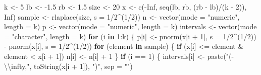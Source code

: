 \documentclass[
]{article}
\newenvironment{Shaded}{\begin{snugshade}}{\end{snugshade}}
\newcommand{\AttributeTok}[1]{\textcolor[rgb]{0.77,0.63,0.00}{#1}}
\newcommand{\ConstantTok}[1]{\textcolor[rgb]{0.00,0.00,0.00}{#1}}
\newcommand{\ControlFlowTok}[1]{\textcolor[rgb]{0.13,0.29,0.53}{\textbf{#1}}}
\newcommand{\DecValTok}[1]{\textcolor[rgb]{0.00,0.00,0.81}{#1}}
\newcommand{\FloatTok}[1]{\textcolor[rgb]{0.00,0.00,0.81}{#1}}
\newcommand{\FunctionTok}[1]{\textcolor[rgb]{0.00,0.00,0.00}{#1}}
\newcommand{\NormalTok}[1]{#1}
\newcommand{\OtherTok}[1]{\textcolor[rgb]{0.56,0.35,0.01}{#1}}
\newcommand{\SpecialCharTok}[1]{\textcolor[rgb]{0.00,0.00,0.00}{#1}}
\newcommand{\StringTok}[1]{\textcolor[rgb]{0.31,0.60,0.02}{#1}}
\begin{document}
\begin{Shaded}
\begin{Highlighting}[]
\NormalTok{k }\OtherTok{\textless{}{-}} \DecValTok{5}
\NormalTok{lb }\OtherTok{\textless{}{-}} \SpecialCharTok{{-}}\FloatTok{1.5}
\NormalTok{rb }\OtherTok{\textless{}{-}} \FloatTok{1.5}
\NormalTok{size }\OtherTok{\textless{}{-}} \DecValTok{20}
\NormalTok{x }\OtherTok{\textless{}{-}} \FunctionTok{c}\NormalTok{(}\SpecialCharTok{{-}}\ConstantTok{Inf}\NormalTok{, }\FunctionTok{seq}\NormalTok{(lb, rb, (rb }\SpecialCharTok{{-}}\NormalTok{ lb)}\SpecialCharTok{/}\NormalTok{(k }\SpecialCharTok{{-}} \DecValTok{2}\NormalTok{)), }\ConstantTok{Inf}\NormalTok{)}
\NormalTok{sample }\OtherTok{\textless{}{-}} \FunctionTok{rlaplace}\NormalTok{(size, }\AttributeTok{s =} \DecValTok{1}\SpecialCharTok{/}\DecValTok{2}\SpecialCharTok{\^{}}\NormalTok{(}\DecValTok{1}\SpecialCharTok{/}\DecValTok{2}\NormalTok{))}
\NormalTok{n }\OtherTok{\textless{}{-}} \FunctionTok{vector}\NormalTok{(}\AttributeTok{mode =} \StringTok{"numeric"}\NormalTok{, }\AttributeTok{length =}\NormalTok{ k)}
\NormalTok{p }\OtherTok{\textless{}{-}} \FunctionTok{vector}\NormalTok{(}\AttributeTok{mode =} \StringTok{"numeric"}\NormalTok{, }\AttributeTok{length =}\NormalTok{ k)}
\NormalTok{intervals }\OtherTok{\textless{}{-}} \FunctionTok{vector}\NormalTok{(}\AttributeTok{mode =} \StringTok{"character"}\NormalTok{, }\AttributeTok{length =}\NormalTok{ k)}
\ControlFlowTok{for}\NormalTok{ (i }\ControlFlowTok{in} \DecValTok{1}\SpecialCharTok{:}\NormalTok{k) \{}
\NormalTok{    p[i] }\OtherTok{\textless{}{-}} \FunctionTok{pnorm}\NormalTok{(x[i }\SpecialCharTok{+} \DecValTok{1}\NormalTok{], }\AttributeTok{s =} \DecValTok{1}\SpecialCharTok{/}\DecValTok{2}\SpecialCharTok{\^{}}\NormalTok{(}\DecValTok{1}\SpecialCharTok{/}\DecValTok{2}\NormalTok{)) }\SpecialCharTok{{-}} \FunctionTok{pnorm}\NormalTok{(x[i], }\AttributeTok{s =} \DecValTok{1}\SpecialCharTok{/}\DecValTok{2}\SpecialCharTok{\^{}}\NormalTok{(}\DecValTok{1}\SpecialCharTok{/}\DecValTok{2}\NormalTok{))}
    \ControlFlowTok{for}\NormalTok{ (element }\ControlFlowTok{in}\NormalTok{ sample) \{}
        \ControlFlowTok{if}\NormalTok{ (x[i] }\SpecialCharTok{\textless{}=}\NormalTok{ element }\SpecialCharTok{\&}\NormalTok{ element }\SpecialCharTok{\textless{}}\NormalTok{ x[i }\SpecialCharTok{+} \DecValTok{1}\NormalTok{]) }
\NormalTok{            n[i] }\OtherTok{\textless{}{-}}\NormalTok{ n[i] }\SpecialCharTok{+} \DecValTok{1}
\NormalTok{    \}}
    \ControlFlowTok{if}\NormalTok{ (i }\SpecialCharTok{==} \DecValTok{1}\NormalTok{) \{}
\NormalTok{        intervals[i] }\OtherTok{\textless{}{-}} \FunctionTok{paste}\NormalTok{(}\StringTok{"({-}}\SpecialCharTok{\textbackslash{}\textbackslash{}}\StringTok{infty,"}\NormalTok{, }\FunctionTok{toString}\NormalTok{(x[i }\SpecialCharTok{+} \DecValTok{1}\NormalTok{]), }\StringTok{")"}\NormalTok{, }\AttributeTok{sep =} \StringTok{""}\NormalTok{)}

\end{Highlighting}
\end{Shaded}
\end{document}
